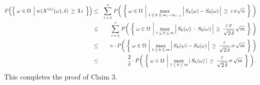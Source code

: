 \begin{eqnarray*}
P\!\left(\left\{\;
	\omega\in\Omega
	\;\left\vert\;
		\overset{{\color{white}1}}{w}(X^{(n)}(\omega),\delta)\,\geq\,3\,\varepsilon
	\right.
\;\right\}\right)
&\leq& \overset{v}{\underset{i\,=\,1}{\sum}}\;
	P\!\left(\;\left\{\; \omega\in\Omega \;\left\vert\;
		\underset{1\,\leq\,k\,\leq\,m_{i}-m_{i-1}}{\max}
			\left\vert\, S_{k}(\omega) \overset{{\color{white}.}}{-} S_{0}(\omega) \,\right\vert
		\,\geq\,\varepsilon\,\sigma\sqrt{n}
		\right.\;\right\}
		\;\right)
\\
&\leq& \overset{v}{\underset{i\,=\,1}{\sum}}\;
	P\!\left(\;\left\{\; \omega\in\Omega \;\left\vert\;
		\underset{1\,\leq\,k\,\leq\,m}{\max}
			\left\vert\, S_{k}(\omega) \overset{{\color{white}.}}{-} S_{0}(\omega) \,\right\vert
		\,\geq\,\dfrac{\varepsilon\,\sigma}{\sqrt{2\,\delta}}\,\sqrt{m}
		\right.\;\right\}
		\;\right)
\\
&\leq&
	v \cdot
	P\!\left(\;\left\{\; \omega\in\Omega \;\left\vert\;
		\underset{1\,\leq\,k\,\leq\,m}{\max}
			\left\vert\, S_{k}(\omega) \overset{{\color{white}.}}{-} S_{0}(\omega) \,\right\vert
		\,\geq\,\dfrac{\varepsilon}{\sqrt{2\,\delta}}\,\sigma\,\sqrt{m}
		\right.\;\right\}
		\;\right)
\\
&\leq&
	\dfrac{2}{\delta} \cdot
	P\!\left(\;\left\{\; \omega\in\Omega \;\left\vert\;
		\underset{1\,\leq\,k\,\leq\,m}{\max}
			\left\vert\, S_{k}(\omega) \,\right\vert
		\,\geq\,\dfrac{\varepsilon}{\sqrt{2\,\delta}}\,\sigma\,\sqrt{m}
		\right.\;\right\}
		\;\right).
\end{eqnarray*}
This completes the proof of Claim 3.


